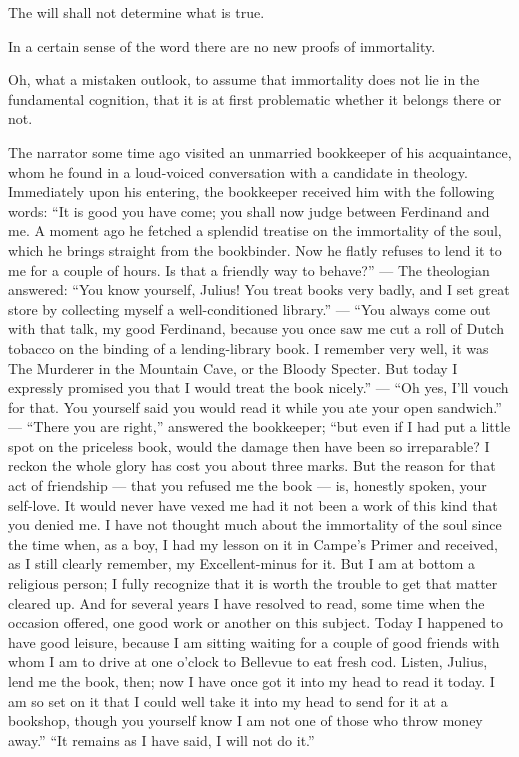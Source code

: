 \documentclass[12pt,a4paper]{article}
\newcommand{\opage}[1]{\marginnote{\footnotesize\textit{[#1]}}}
\newcommand{\aphsep}{\par\smallskip\centerline{\textasteriskcentered}\smallskip}
\begin{document}
The will shall not determine what is true.

\aphsep

In a certain sense of the word there are no new proofs of immortality.

\aphsep

Oh, what a mistaken outlook, to assume that immortality does not lie in the
fundamental cognition, that it is at first problematic whether it belongs there or
not.

\aphsep

The narrator some time ago visited an unmarried bookkeeper of his acquaintance,
whom he found in a loud-voiced conversation with a candidate in theology.
Immediately upon his entering, the bookkeeper received him with the following
words: ``It is good you have come; you shall now judge between Ferdinand and me. A
moment ago he fetched a splendid treatise on the immortality of the soul, which he
brings straight from the bookbinder. Now he flatly refuses to lend it to me for a
couple of hours. Is that a friendly way to behave?'' --- The theologian answered:
``You know yourself, Julius! You treat books very badly, and I set great store by
collecting myself a well-conditioned library.'' --- ``You always come out with
that talk, my good Ferdinand, because you once saw me cut a \opage{45}roll of
Dutch tobacco on the binding of a lending-library book. I remember very well, it
was The Murderer in the Mountain Cave, or the Bloody Specter. But today I
expressly promised you that I would treat the book nicely.'' --- ``Oh yes, I'll
vouch for that. You yourself said you would read it while you ate your open
sandwich.'' --- ``There you are right,'' answered the bookkeeper; ``but even if I
had put a little spot on the priceless book, would the damage then have been so
irreparable? I reckon the whole glory has cost you about three marks. But the
reason for that act of friendship --- that you refused me the book --- is,
honestly spoken, your self-love. It would never have vexed me had it not been a
work of this kind that you denied me. I have not thought much about the
immortality of the soul since the time when, as a boy, I had my lesson on it in
Campe's Primer and received, as I still clearly remember, my Excellent-minus for
it. But I am at bottom a religious person; I fully recognize that it is worth the
trouble to get that matter cleared up. And for several years I have resolved to
read, some time when the occasion offered, one good work or another on this
subject. Today I happened to have good leisure, because I am sitting waiting for a
couple of good friends with whom I am to drive at one o'clock to Bellevue to eat
fresh cod. Listen, Julius, lend me the book, then; now I have once got it into my
head to read it today. I am so set on it that I could well take it into my head to
send for it at a bookshop, though you yourself know I am not one of those who throw
money away.'' ``It remains as I have said, I will not do it.''
\end{document}

